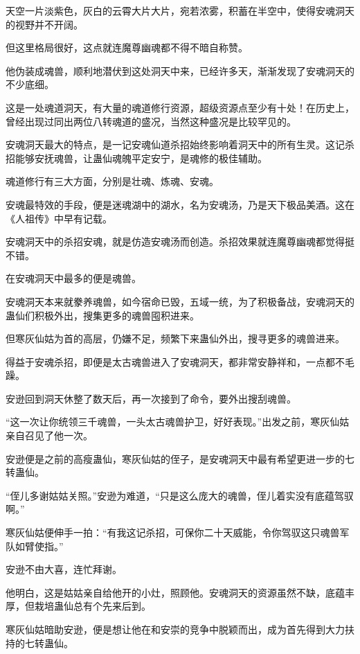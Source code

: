 
\begin{this_body}

天空一片淡紫色，灰白的云霄大片大片，宛若浓雾，积蓄在半空中，使得安魂洞天的视野并不开阔。

但这里格局很好，这点就连魔尊幽魂都不得不暗自称赞。

他伪装成魂兽，顺利地潜伏到这处洞天中来，已经许多天，渐渐发现了安魂洞天的不少底细。

这是一处魂道洞天，有大量的魂道修行资源，超级资源点至少有十处！在历史上，曾经出现过同出两位八转魂道的盛况，当然这种盛况是比较罕见的。

安魂洞天最大的特点，是一记安魂仙道杀招始终影响着洞天中的所有生灵。这记杀招能够安抚魂兽，让蛊仙魂魄平定安宁，是魂修的极佳辅助。

魂道修行有三大方面，分别是壮魂、炼魂、安魂。

安魂最特效的手段，便是迷魂湖中的湖水，名为安魂汤，乃是天下极品美酒。这在《人祖传》中早有记载。

安魂洞天中的杀招安魂，就是仿造安魂汤而创造。杀招效果就连魔尊幽魂都觉得挺不错。

在安魂洞天中最多的便是魂兽。

安魂洞天本来就豢养魂兽，如今宿命已毁，五域一统，为了积极备战，安魂洞天的蛊仙们积极外出，搜集更多的魂兽囤积进来。

但寒灰仙姑为首的高层，仍嫌不足，频繁下来蛊仙外出，搜寻更多的魂兽进来。

得益于安魂杀招，即便是太古魂兽进入了安魂洞天，都非常安静祥和，一点都不毛躁。

安逊回到洞天休整了数天后，再一次接到了命令，要外出搜刮魂兽。

“这一次让你统领三千魂兽，一头太古魂兽护卫，好好表现。”出发之前，寒灰仙姑亲自召见了他一次。

安逊便是之前的高瘦蛊仙，寒灰仙姑的侄子，是安魂洞天中最有希望更进一步的七转蛊仙。

“侄儿多谢姑姑关照。”安逊为难道，“只是这么庞大的魂兽，侄儿着实没有底蕴驾驭啊。”

寒灰仙姑便伸手一拍：“有我这记杀招，可保你二十天威能，令你驾驭这只魂兽军队如臂使指。”

安逊不由大喜，连忙拜谢。

他明白，这是姑姑亲自给他开的小灶，照顾他。安魂洞天的资源虽然不缺，底蕴丰厚，但栽培蛊仙总有个先来后到。

寒灰仙姑暗助安逊，便是想让他在和安崇的竞争中脱颖而出，成为首先得到大力扶持的七转蛊仙。


\end{this_body}
